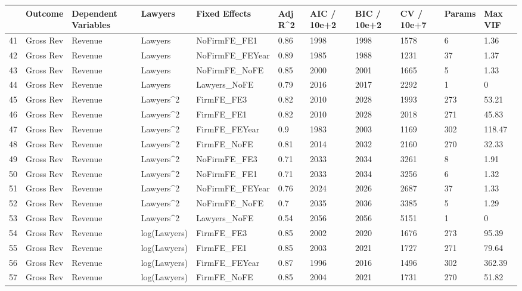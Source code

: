 \documentclass{article}
\begin{document}
\begin{table}[H]
\centering
\begin{tabular}{rllllllllll}
  \hline
 & Outcome & Dependent Variables & Lawyers & Fixed Effects & Adj R^2 & AIC / 10e+2 & BIC / 10e+2 & CV / 10e+7 & Params & Max VIF \\ 
  \hline
41 & Gross Rev & Revenue & Lawyers & NoFirmFE\_FE1 & 0.86 & 1998 & 1998 & 1578 & 6 & 1.36 \\ 
  42 & Gross Rev & Revenue & Lawyers & NoFirmFE\_FEYear & 0.89 & 1985 & 1988 & 1231 & 37 & 1.37 \\ 
  43 & Gross Rev & Revenue & Lawyers & NoFirmFE\_NoFE & 0.85 & 2000 & 2001 & 1665 & 5 & 1.33 \\ 
  44 & Gross Rev & Revenue & Lawyers & Lawyers\_NoFE & 0.79 & 2016 & 2017 & 2292 & 1 & 0 \\ 
  45 & Gross Rev & Revenue & Lawyers^2 & FirmFE\_FE3 & 0.82 & 2010 & 2028 & 1993 & 273 & 53.21 \\ 
  46 & Gross Rev & Revenue & Lawyers^2 & FirmFE\_FE1 & 0.82 & 2010 & 2028 & 2018 & 271 & 45.83 \\ 
  47 & Gross Rev & Revenue & Lawyers^2 & FirmFE\_FEYear & 0.9 & 1983 & 2003 & 1169 & 302 & 118.47 \\ 
  48 & Gross Rev & Revenue & Lawyers^2 & FirmFE\_NoFE & 0.81 & 2014 & 2032 & 2160 & 270 & 32.33 \\ 
  49 & Gross Rev & Revenue & Lawyers^2 & NoFirmFE\_FE3 & 0.71 & 2033 & 2034 & 3261 & 8 & 1.91 \\ 
  50 & Gross Rev & Revenue & Lawyers^2 & NoFirmFE\_FE1 & 0.71 & 2033 & 2034 & 3256 & 6 & 1.32 \\ 
  51 & Gross Rev & Revenue & Lawyers^2 & NoFirmFE\_FEYear & 0.76 & 2024 & 2026 & 2687 & 37 & 1.33 \\ 
  52 & Gross Rev & Revenue & Lawyers^2 & NoFirmFE\_NoFE & 0.7 & 2035 & 2036 & 3385 & 5 & 1.29 \\ 
  53 & Gross Rev & Revenue & Lawyers^2 & Lawyers\_NoFE & 0.54 & 2056 & 2056 & 5151 & 1 & 0 \\ 
  54 & Gross Rev & Revenue & log(Lawyers) & FirmFE\_FE3 & 0.85 & 2002 & 2020 & 1676 & 273 & 95.39 \\ 
  55 & Gross Rev & Revenue & log(Lawyers) & FirmFE\_FE1 & 0.85 & 2003 & 2021 & 1727 & 271 & 79.64 \\ 
  56 & Gross Rev & Revenue & log(Lawyers) & FirmFE\_FEYear & 0.87 & 1996 & 2016 & 1496 & 302 & 362.39 \\ 
  57 & Gross Rev & Revenue & log(Lawyers) & FirmFE\_NoFE & 0.85 & 2004 & 2021 & 1731 & 270 & 51.82 \\ 

\end{tabular}
\end{table}
\end{document}
